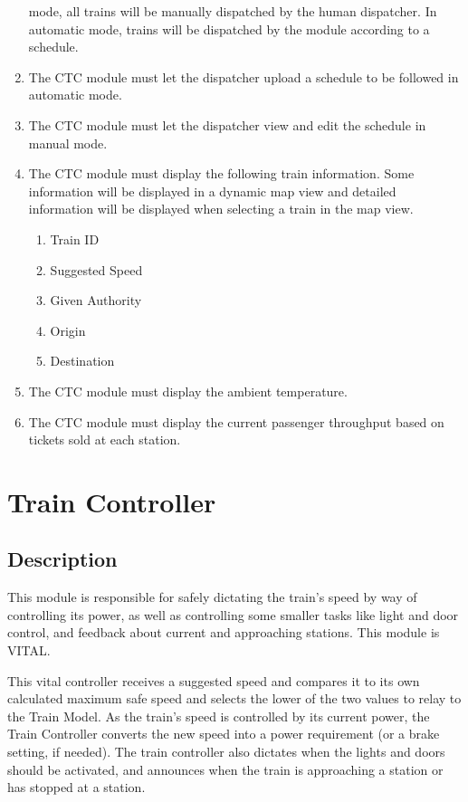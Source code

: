 \documentclass{scrreprt}
\begin{document}
\begin{enumerate}
    mode, all trains will be manually dispatched by the human dispatcher. In automatic 
    mode, trains will be dispatched by the module according to a schedule.
    \item The CTC module must let the dispatcher upload a schedule to be followed in 
    automatic mode.
    \item The CTC module must let the dispatcher view and edit the schedule in manual mode.
    \item The CTC module must display the following train information. Some information 
    will be displayed in a dynamic map view and detailed information will be displayed 
    when selecting a train in the map view.
    \begin{enumerate}
        \item Train ID
        \item Suggested Speed
        \item Given Authority
        \item Origin
        \item Destination
    \end{enumerate}
    \item The CTC module must display the ambient temperature.
    \item The CTC module must display the current passenger throughput based on tickets
    sold at each station.
\end{enumerate}


\section{Train Controller}

\subsection{Description}
This module is responsible for safely dictating the train's speed by way of controlling its power, as well as controlling some smaller tasks like light and door control, and feedback about current and approaching stations. This module is VITAL.

This vital controller receives a suggested speed and compares it to its own calculated maximum safe speed and selects the lower of the two values to relay to the Train Model. As the train's speed is controlled by its current power, the Train Controller converts the new speed into a power requirement (or a brake setting, if needed).  The train controller also dictates when the lights and doors should be activated, and announces when the train is approaching a station or has stopped at a station.
\end{document}
